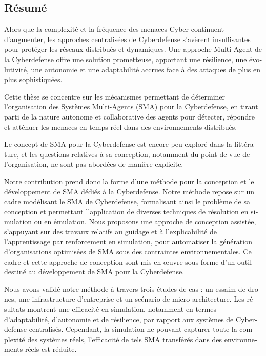 \begingroup
\let\clearpage\relax
\let\cleardoublepage\relax
\let\cleardoublepage\relax

\begin{otherlanguage}{ngerman}
    \chapter*{Résumé}

    Alors que la complexité et la fréquence des menaces Cyber continuent d'augmenter, les approches centralisées de Cyberdefense s'avèrent insuffisantes pour protéger les réseaux distribués et dynamiques. Une approche Multi-Agent de la Cyberdefense offre une solution prometteuse, apportant une résilience, une évolutivité, une autonomie et une adaptabilité accrues face à des attaques de plus en plus sophistiquées.

    Cette thèse se concentre sur les mécanismes permettant de déterminer l'organisation des Systèmes Multi-Agents (SMA) pour la Cyberdefense, en tirant parti de la nature autonome et collaborative des agents pour détecter, répondre et atténuer les menaces en temps réel dans des environnements distribués.
    
    Le concept de SMA pour la Cyberdefense est encore peu exploré dans la littérature, et les questions relatives à sa conception, notamment du point de vue de l'organisation, ne sont pas abordées de manière explicite.
    
    Notre contribution prend donc la forme d'une méthode pour la conception et le développement de SMA dédiés à la Cyberdefense. Notre méthode repose sur un cadre modélisant le SMA de Cyberdefense, formalisant ainsi le problème de sa conception et permettant l'application de diverses techniques de résolution en simulation ou en émulation. Nous proposons une approche de conception assistée, s'appuyant sur des travaux relatifs au guidage et à l'explicabilité de l'apprentissage par renforcement en simulation, pour automatiser la génération d'organisations optimisées de SMA sous des contraintes environnementales. Ce cadre et cette approche de conception sont mis en œuvre sous forme d'un outil destiné au développement de SMA pour la Cyberdefense.
    
    Nous avons validé notre méthode à travers trois études de cas : un essaim de drones, une infrastructure d'entreprise et un scénario de micro-architecture. Les résultats montrent une efficacité en simulation, notamment en termes d'adaptabilité, d'autonomie et de résilience, par rapport aux systèmes de Cyberdefense centralisés. Cependant, la simulation ne pouvant capturer toute la complexité des systèmes réels, l'efficacité de tels SMA transférés dans des environnements réels est réduite.
    

\end{otherlanguage}
